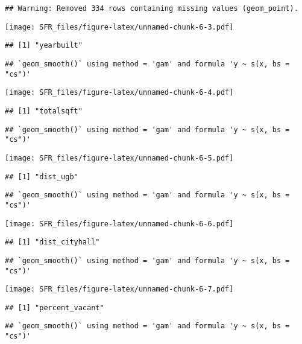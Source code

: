 \documentclass[]{article}
\begin{document}
\begin{verbatim}
## Warning: Removed 334 rows containing missing values (geom_point).
\end{verbatim}

\texttt{[image: SFR\_files/figure-latex/unnamed-chunk-6-3.pdf]}

\begin{verbatim}
## [1] "yearbuilt"
\end{verbatim}

\begin{verbatim}
## `geom_smooth()` using method = 'gam' and formula 'y ~ s(x, bs = "cs")'
\end{verbatim}

\texttt{[image: SFR\_files/figure-latex/unnamed-chunk-6-4.pdf]}

\begin{verbatim}
## [1] "totalsqft"
\end{verbatim}

\begin{verbatim}
## `geom_smooth()` using method = 'gam' and formula 'y ~ s(x, bs = "cs")'
\end{verbatim}

\texttt{[image: SFR\_files/figure-latex/unnamed-chunk-6-5.pdf]}

\begin{verbatim}
## [1] "dist_ugb"
\end{verbatim}

\begin{verbatim}
## `geom_smooth()` using method = 'gam' and formula 'y ~ s(x, bs = "cs")'
\end{verbatim}

\texttt{[image: SFR\_files/figure-latex/unnamed-chunk-6-6.pdf]}

\begin{verbatim}
## [1] "dist_cityhall"
\end{verbatim}

\begin{verbatim}
## `geom_smooth()` using method = 'gam' and formula 'y ~ s(x, bs = "cs")'
\end{verbatim}

\texttt{[image: SFR\_files/figure-latex/unnamed-chunk-6-7.pdf]}

\begin{verbatim}
## [1] "percent_vacant"
\end{verbatim}

\begin{verbatim}
## `geom_smooth()` using method = 'gam' and formula 'y ~ s(x, bs = "cs")'
\end{verbatim}
\end{document}
